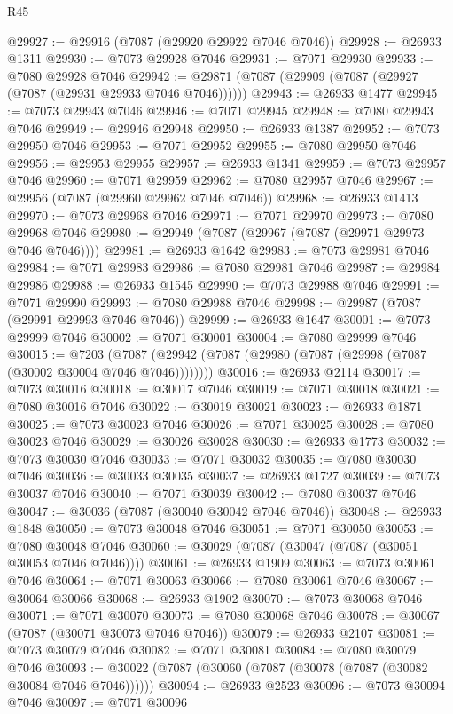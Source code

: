 \begin{lexlean}{R45}
\begin{coremodule}
{@29927 := @29916 (@7087 (@29920 @29922 @7046 @7046))
@29928 := @26933 @1311
@29930 := @7073 @29928 @7046
@29931 := @7071 @29930
@29933 := @7080 @29928 @7046
@29942 := @29871 (@7087 (@29909 (@7087 (@29927 (@7087 (@29931 @29933 @7046 @7046))))))
@29943 := @26933 @1477
@29945 := @7073 @29943 @7046
@29946 := @7071 @29945
@29948 := @7080 @29943 @7046
@29949 := @29946 @29948
@29950 := @26933 @1387
@29952 := @7073 @29950 @7046
@29953 := @7071 @29952
@29955 := @7080 @29950 @7046
@29956 := @29953 @29955
@29957 := @26933 @1341
@29959 := @7073 @29957 @7046
@29960 := @7071 @29959
@29962 := @7080 @29957 @7046
@29967 := @29956 (@7087 (@29960 @29962 @7046 @7046))
@29968 := @26933 @1413
@29970 := @7073 @29968 @7046
@29971 := @7071 @29970
@29973 := @7080 @29968 @7046
@29980 := @29949 (@7087 (@29967 (@7087 (@29971 @29973 @7046 @7046))))
@29981 := @26933 @1642
@29983 := @7073 @29981 @7046
@29984 := @7071 @29983
@29986 := @7080 @29981 @7046
@29987 := @29984 @29986
@29988 := @26933 @1545
@29990 := @7073 @29988 @7046
@29991 := @7071 @29990
@29993 := @7080 @29988 @7046
@29998 := @29987 (@7087 (@29991 @29993 @7046 @7046))
@29999 := @26933 @1647
@30001 := @7073 @29999 @7046
@30002 := @7071 @30001
@30004 := @7080 @29999 @7046
@30015 := @7203
    (@7087 (@29942 (@7087 (@29980 (@7087 (@29998 (@7087 (@30002 @30004 @7046 @7046))))))))
@30016 := @26933 @2114
@30017 := @7073 @30016
@30018 := @30017 @7046
@30019 := @7071 @30018
@30021 := @7080 @30016 @7046
@30022 := @30019 @30021
@30023 := @26933 @1871
@30025 := @7073 @30023 @7046
@30026 := @7071 @30025
@30028 := @7080 @30023 @7046
@30029 := @30026 @30028
@30030 := @26933 @1773
@30032 := @7073 @30030 @7046
@30033 := @7071 @30032
@30035 := @7080 @30030 @7046
@30036 := @30033 @30035
@30037 := @26933 @1727
@30039 := @7073 @30037 @7046
@30040 := @7071 @30039
@30042 := @7080 @30037 @7046
@30047 := @30036 (@7087 (@30040 @30042 @7046 @7046))
@30048 := @26933 @1848
@30050 := @7073 @30048 @7046
@30051 := @7071 @30050
@30053 := @7080 @30048 @7046
@30060 := @30029 (@7087 (@30047 (@7087 (@30051 @30053 @7046 @7046))))
@30061 := @26933 @1909
@30063 := @7073 @30061 @7046
@30064 := @7071 @30063
@30066 := @7080 @30061 @7046
@30067 := @30064 @30066
@30068 := @26933 @1902
@30070 := @7073 @30068 @7046
@30071 := @7071 @30070
@30073 := @7080 @30068 @7046
@30078 := @30067 (@7087 (@30071 @30073 @7046 @7046))
@30079 := @26933 @2107
@30081 := @7073 @30079 @7046
@30082 := @7071 @30081
@30084 := @7080 @30079 @7046
@30093 := @30022 (@7087 (@30060 (@7087 (@30078 (@7087 (@30082 @30084 @7046 @7046))))))
@30094 := @26933 @2523
@30096 := @7073 @30094 @7046
@30097 := @7071 @30096
}
\end{coremodule}
\end{lexlean}
